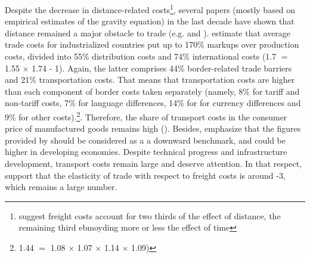 \documentclass[a4paper,11pt]{article}
\begin{document}
Despite the decrease in distance-related costs\footnote{\citet{Behar_Venables} suggest freight costs account for two thirds of the effect of distance, the remaining third ebmoyding more or less the effect of time}, several papers (mostly based on empirical estimates of the gravity equation) in the last decade have shown that distance remained a major obstacle to trade (e.g. \citealp{Head_Mayer04} and \citealp{Disdier_Head08}). \citet{anderson_wincoop_jel} estimate that average trade costs for industrialized countries put up to 170\% markups over production costs, divided into 55\% distribution costs and 74\% international costs (1.7 $=$ 1.55 $\times$ 1.74 - 1). Again, the latter comprises 44\% border-related trade barriers and 21\% transportation costs. That means that transportation costs are higher than each component of border costs taken separately (namely, 8\% for tariff and non-tariff costs, 7\% for language differences, 14\% for for currency differences and 9\% for other costs).\footnote{1.44 $=$ 1.08 $\times$ 1.07 $\times$ 1.14 $\times$  1.09)}. Therefore, the share of transport costs in the consumer price of manufactured goods remains high (\citealp{Lafourcade_Thisse}). Besides, \citet{combes_lafourcade} emphasize that the figures provided by \citet{anderson_wincoop_jel} should be considered as a a downward benchmark, and could be higher in developing economies. Despite technical progress and infrastructure development, transport costs remain large and deserve attention. In that respect, \citet{Behar_Venables} support that the elasticity of trade with respect to freight costs is around -3, which remains a large number.
\end{document}
